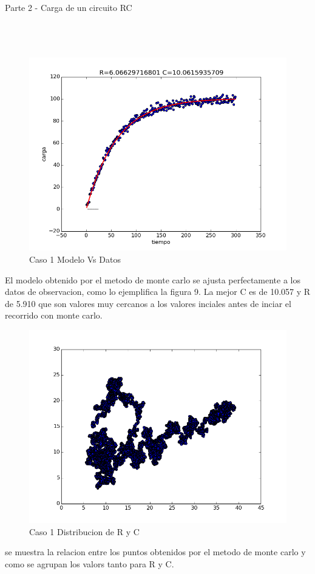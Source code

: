 \documentclass{article}
\begin{document}
\newpage
Parte 2 - Carga de un circuito RC\\
\\
\\
\\
\begin{figure}[h!]
  \includegraphics[scale=0.5]{modelo_Vs_datos.png}
  \caption{Caso 1 Modelo Vs Datos   }
\end{figure}
   El modelo obtenido por el metodo de monte carlo se ajusta perfectamente a los datos de observacion, como lo ejemplifica la figura 9. La mejor C es de 10.057 y R de 5.910 que son valores muy cercanos a los valores inciales antes de inciar el recorrido con monte carlo. \\

\newpage
\begin{figure}[h!]
  \includegraphics[scale=0.5]{distribucion.png}
  \caption{Caso 1 Distribucion de R y C  }
\end{figure}
se muestra la relacion entre los puntos obtenidos por el metodo de monte carlo y como se agrupan los valors tanto para R y C. \\
\end{document}
